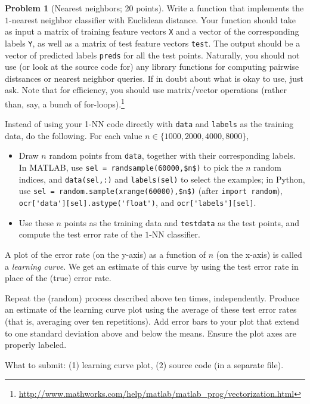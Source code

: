 \documentclass[11pt]{article}
\newcommand\braces[1]{\{#1\}}
\theoremstyle{definition}
\newtheorem{problem}{Problem}
\begin{document}
\begin{problem}[Nearest neighbors; 20 points]
  Write a function that implements the $1$-nearest neighbor classifier
  with Euclidean distance.
  Your function should take as input a matrix of training feature
  vectors \texttt{X} and a vector of the corresponding labels
  \texttt{Y}, as well as a matrix of test feature vectors
  \texttt{test}.
  The output should be a vector of predicted labels \texttt{preds} for
  all the test points.
  Naturally, you should not use (or look at the source code for) any library
  functions for computing pairwise distsances or nearest neighbor queries.
  If in doubt about what is okay to use, just ask.
  Note that for efficiency, you should use matrix/vector operations (rather
  than, say, a bunch of for-loops).\footnote{%
    \url{http://www.mathworks.com/help/matlab/matlab_prog/vectorization.html}%
  }

  Instead of using your 1-NN code directly with \texttt{data} and
  \texttt{labels} as the training data, do the following.
  For each value $n \in \braces{1000,2000,4000,8000}$,
  \begin{itemize}
    \item
      Draw $n$ random points from \texttt{data}, together with their
      corresponding labels.
      In MATLAB, use \lstinline{sel = randsample(60000,$n$)} to pick the
      $n$ random indices, and \texttt{data(sel,:)} and
      \lstinline{labels(sel)} to select the examples; in Python, use
      \lstinline{sel = random.sample(xrange(60000),$n$)} (after
      \lstinline{import random}),
      \lstinline{ocr['data'][sel].astype('float')}, and
      \lstinline{ocr['labels'][sel]}.

    \item
      Use these $n$ points as the training data and \texttt{testdata}
      as the test points, and compute the test error rate of the
      $1$-NN classifier.

  \end{itemize}
  A plot of the error rate (on the y-axis) as a function of $n$ (on
  the x-axis) is called a \emph{learning curve}.
  We get an estimate of this curve by using the test error rate in
  place of the (true) error rate.

  Repeat the (random) process described above ten times, independently.
  Produce an estimate of the learning curve plot using the average of
  these test error rates (that is, averaging over ten repetitions).
  Add error bars to your plot that extend to one standard deviation
  above and below the means.
  Ensure the plot axes are properly labeled.

  What to submit:
  (1) learning curve plot, (2) source code (in a separate file).
\end{problem}
\end{document}
